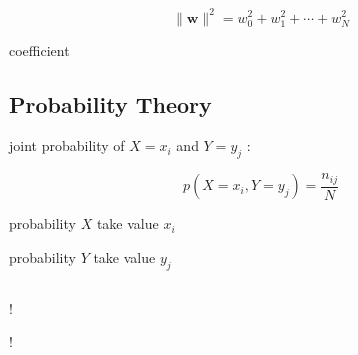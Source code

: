 \documentclass[11pt, a4paper, oneside]{article}
\begin{document}
$$
\| \mathbf{w} \| ^2 = w_0^2 + w_1^2 + \cdots + w_N^2
$$

\begin{description}[labelwidth=\widthof{\bfseries 1234567890},align=parright]
	\item[$\lambda :$] coefficient
\end{description}

\bigskip

\subsection{Probability Theory}

\begin{center}
\end{center}

joint probability of $X = x_i$ and $Y = y_j$ :

\begin{equation}
p(X = x_i, Y = y_j) = \frac{n_{ij}}{N}
\tag{1.5}
\end{equation}

\begin{description}[labelwidth=\widthof{\bfseries 1234567890},align=parright]
	\item[$X = x_i :$] probability $X$ take value $x_i$
	\item[$Y = y_j :$] probability $Y$ take value $y_j$
\end{description}


\bigskip



\begin{equation}
\tag{}
\end{equation}

\begin{description}[labelwidth=\widthof{\bfseries 1234567890},align=parright]
	\item[$!$] !
	\item[$!$] !
\end{description}
\end{document}
